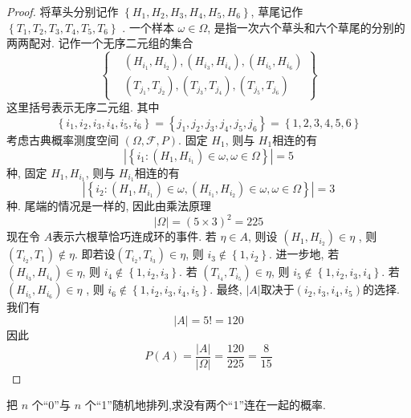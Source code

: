 \documentclass[../main.tex]{subfiles}
\begin{document}
\begin{proof}
    将草头分别记作 \(  \left\{ H_1,H_2,H_3,H_4,H_5,H_6 \right\}  \), 草尾记作 \(  \left\{ T_1,T_2,T_3,T_4,T_5,T_6 \right\}  \)  . 一个样本 \(   \omega \in  \Omega   \), 是指一次六个草头和六个草尾的分别的两两配对. 记作一个无序二元组的集合 \[
    \left\{ \begin{aligned}
    &\left( H_{i_1},H_{i_2} \right), \left( H_{i_3},H_{i_4} \right), \left( H_{i_5},H_{i_6} \right)  \\ 
     &\left( T_{j_1}, T_{j_2} \right), \left( T_{j_3}, T_{j_4} \right), \left( T_{j_5}, T_{j_6} \right)    
    \end{aligned}  \right\}
    \]这里括号表示无序二元组. 其中 \[
    \left\{ i_1,i_2,i_3,i_4,i_5,i_6 \right\}= \left\{ j_1,j_2,j_3,j_4,j_5,j_6 \right\}= \left\{ 1,2,3,4,5,6 \right\}
    \]考虑古典概率测度空间 \(  \left(  \Omega ,\mathcal{F},P \right)   \). 固定 \(  H_1  \), 则与 \(  H_1  \)相连的有  \[
    \left| \left\{ i_1: \left( H_1,H_{i_1} \right)\in  \omega ,  \omega \in  \Omega   \right\} \right|= 5 
    \]种, 固定 \(  H_1,H_{i_1}  \), 则与 \(  H_{i_1}  \)相连的有  \[
    \left| \left\{ i_2: \left( H_1,H_{i_1} \right)\in  \omega , \left( H_{i_1},H_{i_2} \right)\in  \omega ,  \omega \in  \Omega    \right\} \right|= 3 
    \] 种. 尾端的情况是一样的, 因此由乘法原理 \[
    \left|  \Omega  \right|= \left( 5\times 3 \right)^{2}= 225  
    \]现在令 \(  A  \)表示六根草恰巧连成环的事件. 若 \(  \eta \in A  \), 则设 \(  \left( H_{1},H_{i_2} \right)\in \eta    \) , 则 \(  \left( T_{i_2},T_{1} \right)\not \in \eta    \). 即若设\(  \left( T_{i_2},T_{i_3} \right)\in \eta    \),     则 \(  i_3\not \in \left\{ 1,i_2 \right\}  \). 进一步地,  若 \(  \left( H_{i_3},H_{i_4} \right)\in \eta    \), 则 \(  i_4\not \in \left\{ 1,i_2,i_3 \right\}  \). 若 \(  \left( T_{i_4},T_{i_5} \right)\in \eta    \), 则 \(  i_5\not \in \left\{ 1,i_2,i_3, i_4 \right\}  \). 若 \(  \left( H_{i_5},H_{i_6} \right)\in \eta    \) , 则 \(  i_6\not \in \left\{ 1,i_2,i_3,i_4,i_5 \right\}  \). 最终, \(  \left| A \right|   \)取决于\(  \left( i_2,i_3,i_4,i_5 \right)   \)的选择.    我们有 \[
    \left| A \right|= 5!=  120
    \]因此 \[
    P\left( A \right)= \frac{\left| A \right|  }{\left|  \Omega  \right|  }= \frac{120 }{225 }   = \frac{8 }{15 } 
    \]    
\end{proof}

\begin{exercise}{}{}
把 $n$ 个“0”与 $n$ 个“1”随机地排列,求没有两个“1”连在一起的概率.
\end{exercise}
\end{document}
